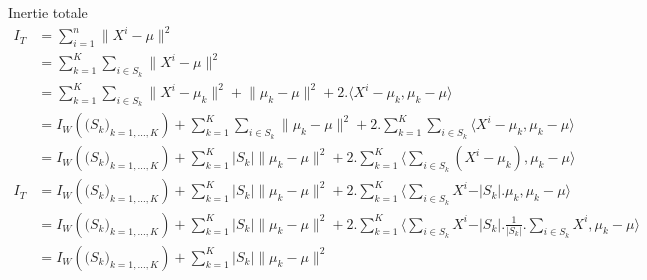 \documentclass[8pt]{beamer}
\begin{document}
			\begin{frame}[allowframebreaks]{Inertie totale}
				\begin{align*}
					I_T &= \sum_{i=1}^{n} \lVert X^i - \mu \rVert^2\\
						&= \sum_{k= 1}^{K} \sum_{i\in S_k} \lVert X^i - \mu \rVert^2\\
						&= \sum_{k= 1}^{K} \sum_{i\in S_k} \lVert X^i - \mu_k \rVert^2 + \lVert \mu_k - \mu \rVert^2 + 2. \langle X^i-\mu_k, \mu_k-\mu \rangle\\
						&= I_W(\big(S_k\big)_{k = 1, \dots, K}) + \sum_{k= 1}^{K} \sum_{i\in S_k} \lVert \mu_k - \mu \rVert^2 + 2 . \sum_{k= 1}^{K} \sum_{i\in S_k} \langle X^i-\mu_k, \mu_k-\mu \rangle\\
						&= I_W(\big(S_k\big)_{k = 1, \dots, K}) + \sum_{k= 1}^{K} \vert S_k \vert \lVert \mu_k - \mu \rVert^2 + 2 . \sum_{k= 1}^{K} \langle \sum_{i\in S_k} (X^i-\mu_k), \mu_k-\mu \rangle
				\end{align*}
				\begin{align*}
					I_T &= I_W(\big(S_k\big)_{k = 1, \dots, K}) + \sum_{k= 1}^{K} \vert S_k \vert \lVert \mu_k - \mu \rVert^2 + 2 . \sum_{k= 1}^{K} \langle \sum_{i\in S_k} X^i - \vert S_k \vert . \mu_k, \mu_k-\mu \rangle\\
						&= I_W(\big(S_k\big)_{k = 1, \dots, K}) + \sum_{k= 1}^{K} \vert S_k \vert \lVert \mu_k - \mu \rVert^2 + 2 . \sum_{k= 1}^{K} \langle \sum_{i\in S_k} X^i - \vert S_k \vert . \frac{1}{\vert S_k \vert} . \sum_{i\in S_k} X^i, \mu_k-\mu \rangle\\
						&= I_W(\big(S_k\big)_{k = 1, \dots, K}) + \sum_{k= 1}^{K} \vert S_k \vert \lVert \mu_k - \mu \rVert^2
				\end{align*}
			\end{frame}
\end{document}
